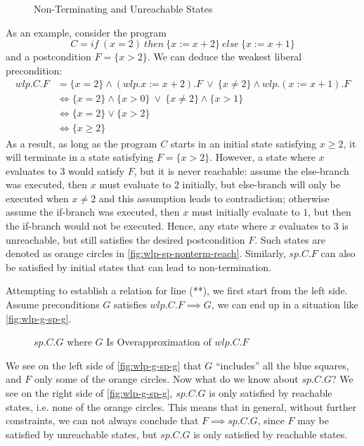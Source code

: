 \begin{figure}[ht]
	\centering
	
	\caption{Non-Terminating and Unreachable States}
	\label{fig:wlp-sp-nonterm-reach}
\end{figure}

As an example, consider the program 
$$C=if\ (x=2)\ then\ \{x:=x+2\}\ else\ \{x:=x+1\}$$
and a postcondition $F=\{x>2\}$.
We can deduce the weakest liberal precondition: 
\begin{align*}
	wlp.C.F &= \{x=2\}\wedge (wlp.x:=x+2).F\ \vee\ \{x\neq 2\} \wedge wlp.(x:=x+1).F\\
	&\Leftrightarrow\{x=2\}\wedge \{x>0\}\  \vee \ \{x\neq 2\}\wedge\{x>1\}\\
	&\Leftrightarrow\{x=2\} \vee \{x>2\}\\ 
	&\Leftrightarrow \{x\geq 2\}
\end{align*}
As a result, as long as the program $C$ starts in an initial state satisfying $x\geq 2$, it will terminate in a state satisfying $F=\{x>2\}$. 
However, a state where $x$ evaluates to $3$ would satisfy $F$, but it is never reachable: assume the else-branch was executed, then $x$ must evaluate to $2$ initially, but else-branch will only be executed when $x\neq 2$ and this assumption leads to contradiction; otherwise assume the if-branch was executed, then $x$ must initially evaluate to $1$, but then the if-branch would not be executed. 
Hence, any state where $x$ evaluates to $3$ is unreachable, but still satisfies the desired postcondition $F$. 
Such states are denoted as orange circles in \autoref{fig:wlp-sp-nonterm-reach}. 
Similarly, $sp.C.F$ can also be satisfied by initial states that can lead to non-termination.

Attempting to establish a relation for line (**), we first start from the left side. 
Assume preconditions $G$ satisfies $wlp.C.F\implies G$, we can end up in a situation like \autoref{fig:wlp-g-sp-g}. 

\begin{figure}[ht]
	\centering
	
	\caption{$sp.C.G$ where $G$ Is Overapproximation of $wlp.C.F$}
	\label{fig:wlp-g-sp-g}
\end{figure}

\newcommand{\nimplies}{\rlap{\(\quad\not\)}\implies} %
We see on the left side of \autoref{fig:wlp-g-sp-g} that $G$ ``includes'' all the blue squares, and $F$ only some of the orange circles. 
Now what do we know about $sp.C.G$? 
We see on the right side of \autoref{fig:wlp-g-sp-g}, $sp.C.G$ is only satisfied by reachable states, i.e. none of the orange circles. 
This means that in general, without further constraints, we can not always conclude that $F\implies sp.C.G$, since $F$ may be satisfied by unreachable states, but $sp.C.G$ is only satisfied by reachable states. 

